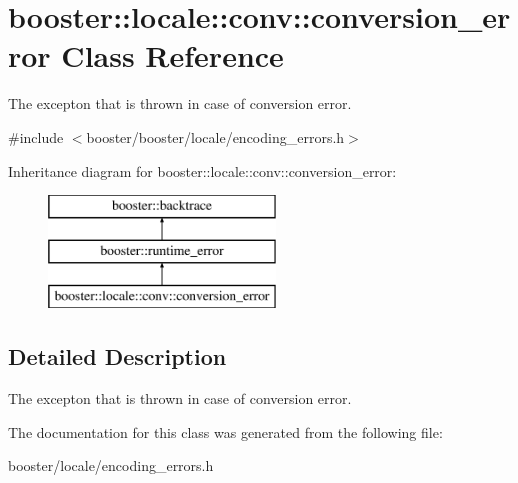 \section{booster\-:\-:locale\-:\-:conv\-:\-:conversion\-\_\-error \-Class \-Reference}
\label{classbooster_1_1locale_1_1conv_1_1conversion__error}


\-The excepton that is thrown in case of conversion error.  




{\ttfamily \#include $<$booster/booster/locale/encoding\-\_\-errors.\-h$>$}

\-Inheritance diagram for booster\-:\-:locale\-:\-:conv\-:\-:conversion\-\_\-error\-:\begin{figure}[H]
\begin{center}
\leavevmode
\includegraphics[height=3.000000cm]{classbooster_1_1locale_1_1conv_1_1conversion__error}
\end{center}
\end{figure}


\subsection{\-Detailed \-Description}
\-The excepton that is thrown in case of conversion error. 

\-The documentation for this class was generated from the following file\-:\begin{DoxyCompactItemize}
\item 
booster/locale/encoding\-\_\-errors.\-h\end{DoxyCompactItemize}
